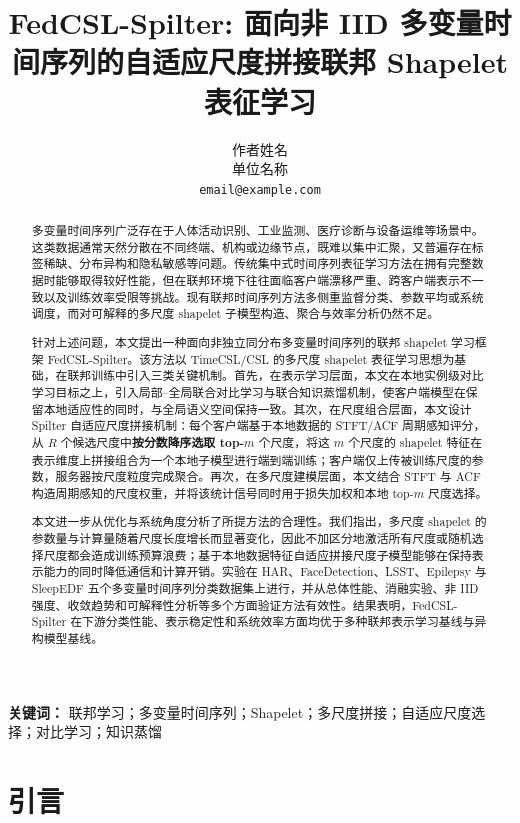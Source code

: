 \documentclass{article}
\title{FedCSL-Spilter: 面向非 IID 多变量时间序列的自适应尺度拼接联邦 Shapelet 表征学习}
\author{%
  作者姓名 \\
  单位名称 \\
  \texttt{email@example.com}
}
\begin{document}
\maketitle

\renewcommand{\abstractname}{摘要}

\begin{abstract}
多变量时间序列广泛存在于人体活动识别、工业监测、医疗诊断与设备运维等场景中。这类数据通常天然分散在不同终端、机构或边缘节点，既难以集中汇聚，又普遍存在标签稀缺、分布异构和隐私敏感等问题。传统集中式时间序列表征学习方法在拥有完整数据时能够取得较好性能，但在联邦环境下往往面临客户端漂移严重、跨客户端表示不一致以及训练效率受限等挑战。现有联邦时间序列方法多侧重监督分类、参数平均或系统调度，而对可解释的多尺度 shapelet 子模型构造、聚合与效率分析仍然不足。

针对上述问题，本文提出一种面向非独立同分布多变量时间序列的联邦 shapelet 学习框架 FedCSL-Spilter。该方法以 TimeCSL/CSL 的多尺度 shapelet 表征学习思想为基础，在联邦训练中引入三类关键机制。首先，在表示学习层面，本文在本地实例级对比学习目标之上，引入局部--全局联合对比学习与联合知识蒸馏机制，使客户端模型在保留本地适应性的同时，与全局语义空间保持一致。其次，在尺度组合层面，本文设计 Spilter 自适应尺度拼接机制：每个客户端基于本地数据的 STFT/ACF 周期感知评分，从 $R$ 个候选尺度中\textbf{按分数降序选取 top-$m$} 个尺度，将这 $m$ 个尺度的 shapelet 特征在表示维度上拼接组合为一个本地子模型进行端到端训练；客户端仅上传被训练尺度的参数，服务器按尺度粒度完成聚合。再次，在多尺度建模层面，本文结合 STFT 与 ACF 构造周期感知的尺度权重，并将该统计信号同时用于损失加权和本地 top-$m$ 尺度选择。

本文进一步从优化与系统角度分析了所提方法的合理性。我们指出，多尺度 shapelet 的参数量与计算量随着尺度长度增长而显著变化，因此不加区分地激活所有尺度或随机选择尺度都会造成训练预算浪费；基于本地数据特征自适应拼接尺度子模型能够在保持表示能力的同时降低通信和计算开销。实验在 HAR、FaceDetection、LSST、Epilepsy 与 SleepEDF 五个多变量时间序列分类数据集上进行，并从总体性能、消融实验、非 IID 强度、收敛趋势和可解释性分析等多个方面验证方法有效性。结果表明，FedCSL-Spilter 在下游分类性能、表示稳定性和系统效率方面均优于多种联邦表示学习基线与异构模型基线。
\end{abstract}

\noindent\textbf{关键词：} 联邦学习；多变量时间序列；Shapelet；多尺度拼接；自适应尺度选择；对比学习；知识蒸馏

\section{引言}
\end{document}
